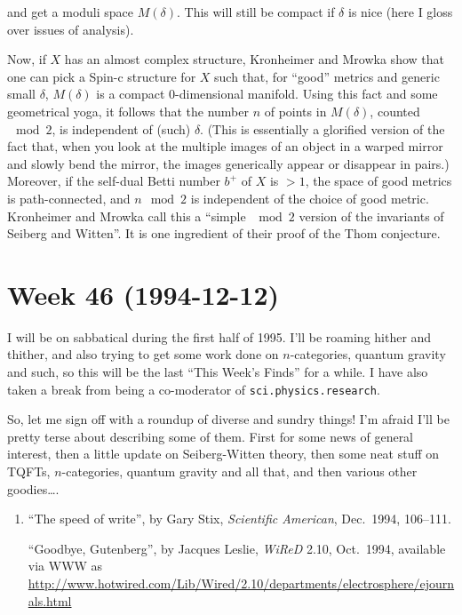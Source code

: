 \documentclass{article}
\begin{document}
and get a moduli space \(M(\delta)\). This will still be compact if
\(\delta\) is nice (here I gloss over issues of analysis).

Now, if \(X\) has an almost complex structure, Kronheimer and Mrowka
show that one can pick a Spin-c structure for \(X\) such that, for
``good'' metrics and generic small \(\delta\), \(M(\delta)\) is a
compact 0-dimensional manifold. Using this fact and some geometrical
yoga, it follows that the number \(n\) of points in \(M(\delta)\),
counted \(\mod 2\), is independent of (such) \(\delta\). (This is
essentially a glorified version of the fact that, when you look at the
multiple images of an object in a warped mirror and slowly bend the
mirror, the images generically appear or disappear in pairs.) Moreover,
if the self-dual Betti number \(b^+\) of \(X\) is \(> 1\), the space of
good metrics is path-connected, and \(n \mod 2\) is independent of the
choice of good metric. Kronheimer and Mrowka call this a ``simple
\(\mod 2\) version of the invariants of Seiberg and Witten''. It is one
ingredient of their proof of the Thom conjecture.
\hypertarget{week-46-1994-12-12}{%
\section{Week 46 (1994-12-12)}\label{week-46-1994-12-12}}

I will be on sabbatical during the first half of 1995. I'll be roaming
hither and thither, and also trying to get some work done on
\(n\)-categories, quantum gravity and such, so this will be the last
``This Week's Finds'' for a while. I have also taken a break from being
a co-moderator of \texttt{sci.physics.research}.

So, let me sign off with a roundup of diverse and sundry things! I'm
afraid I'll be pretty terse about describing some of them. First for
some news of general interest, then a little update on Seiberg-Witten
theory, then some neat stuff on TQFTs, \(n\)-categories, quantum gravity
and all that, and then various other goodies\ldots.

\begin{enumerate}
\def\labelenumi{\arabic{enumi})}
\item
  ``The speed of write'', by Gary Stix, \emph{Scientific American},
  Dec.~1994, 106--111.

  ``Goodbye, Gutenberg'', by Jacques Leslie, \emph{WiReD} 2.10,
  Oct.~1994, available via WWW as
  \url{http://www.hotwired.com/Lib/Wired/2.10/departments/electrosphere/ejournals.html}
\end{enumerate}
\end{document}
